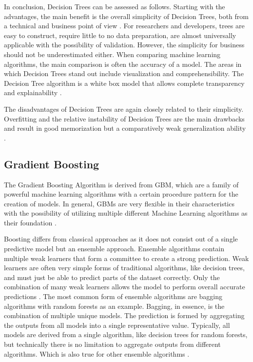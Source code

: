 In conclusion, Decision Trees can be assessed as follows. Starting with the advantages,
the main benefit is the overall simplicity of Decision Trees, both from a technical and 
business point of view \cite[p.339]{James2021}. For researchers and developers, trees are easy to construct, require little
to no data preparation, are almost universally applicable with the possibility of validation. 
However, the simplicity for business should not be underestimated either. When comparing machine
learning algorithms, the main comparison is often the accuracy of a model. The areas in which 
Decision Trees stand out include visualization and comprehensibility. The Decision Tree algorithm 
is a white box model that allows complete transparency and explainability \cite[10.10.]{scikit-decision_tree}. 

The disadvantages of Decision Trees are again closely related to their simplicity. Overfitting and 
the relative instability of Decision Trees are the main drawbacks and result in good memorization 
but a comparatively weak generalization ability \cite[p.340]{James2021} \cite[10.10.]{scikit-decision_tree}.

\subsection{Gradient Boosting}
\label{sec:Gradient Boosting}


The Gradient Boosting Algorithm is derived from \ac{GBM}, which are a family of 
powerful machine learning algorithms with a certain procedure pattern for the creation of models. 
In general, \acp{GBM} are very flexible in their characteristics with the possibility of utilizing 
multiple different Machine Learning algorithms as their foundation \cite{Natekin2013}.

Boosting differs from classical approaches as it does not consist out of a single predictive 
model but an ensemble approach. Ensemble algorithms contain multiple weak learners that form a 
committee to create a strong prediction. Weak learners are often very simple forms of traditional 
algorithms, like decision trees, and must just be able to predict parts of the dataset correctly. 
Only the combination of many weak learners allows the model to perform overall accurate 
predictions \cite{parr2022gb_explained_dtt} \cite[p.1f]{Buhlmann2004Bagging}. The most common form of ensemble algorithms are bagging algorithms with random 
forests as an example. Bagging, in essence, is the combination of multiple unique models. The 
prediction is formed by aggregating the outputs from all models into a single representative 
value. Typically, all models are derived from a single algorithm, like decision trees for random 
forests, but technically there is no limitation to aggregate outputs from different algorithms. 
Which is also true for other ensemble algorithms \cite[p.2]{Buhlmann2004Bagging}. 

